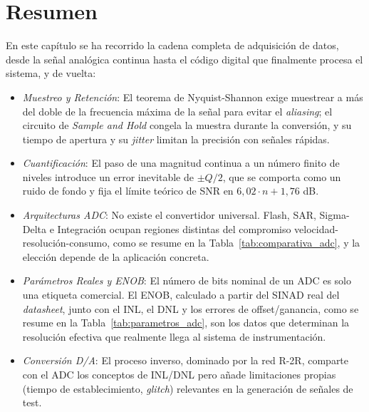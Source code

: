 
\section{Resumen}\label{sec:resumen_daq}

En este capítulo se ha recorrido la cadena completa de adquisición de datos, desde la señal analógica continua hasta el código digital que finalmente procesa el sistema, y de vuelta:

\begin{itemize}
    \item \emph{Muestreo y Retención}: El teorema de Nyquist-Shannon exige muestrear a más del doble de la frecuencia máxima de la señal para evitar el \textit{aliasing}; el circuito de \textit{Sample and Hold} congela la muestra durante la conversión, y su tiempo de apertura y su \textit{jitter} limitan la precisión con señales rápidas.
    \item \emph{Cuantificación}: El paso de una magnitud continua a un número finito de niveles introduce un error inevitable de $\pm Q/2$, que se comporta como un ruido de fondo y fija el límite teórico de SNR en $6{,}02\cdot n + 1{,}76$ dB.
    \item \emph{Arquitecturas ADC}: No existe el convertidor universal. Flash, SAR, Sigma-Delta e Integración ocupan regiones distintas del compromiso velocidad-resolución-consumo, como se resume en la Tabla~\ref{tab:comparativa_adc}, y la elección depende de la aplicación concreta.
    \item \emph{Parámetros Reales y ENOB}: El número de bits nominal de un ADC es solo una etiqueta comercial. El ENOB, calculado a partir del SINAD real del \textit{datasheet}, junto con el INL, el DNL y los errores de offset/ganancia, como se resume en la Tabla~\ref{tab:parametros_adc}, son los datos que determinan la resolución efectiva que realmente llega al sistema de instrumentación.
    \item \emph{Conversión D/A}: El proceso inverso, dominado por la red R-2R, comparte con el ADC los conceptos de INL/DNL pero añade limitaciones propias (tiempo de establecimiento, \textit{glitch}) relevantes en la generación de señales de test.
\end{itemize}
